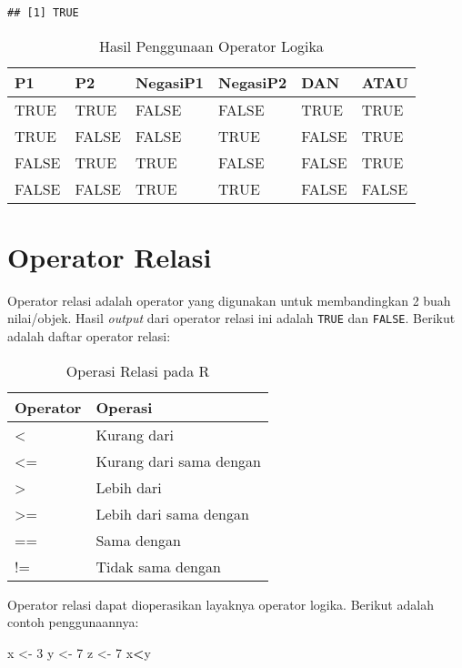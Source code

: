 \documentclass[
]{book}
\newenvironment{Shaded}{\begin{snugshade}}{\end{snugshade}}
\newcommand{\DecValTok}[1]{\textcolor[rgb]{0.00,0.00,0.81}{#1}}
\newcommand{\NormalTok}[1]{#1}
\newcommand{\OperatorTok}[1]{\textcolor[rgb]{0.81,0.36,0.00}{\textbf{#1}}}
\newcommand{\StringTok}[1]{\textcolor[rgb]{0.31,0.60,0.02}{#1}}
\begin{document}
\begin{verbatim}
## [1] TRUE
\end{verbatim}

\begin{table}

\caption{\label{tab:unnamed-chunk-28}Hasil Penggunaan Operator Logika}
\centering
\begin{tabular}[t]{llllll}
\toprule
P1 & P2 & NegasiP1 & NegasiP2 & DAN & ATAU\\
\midrule
TRUE & TRUE & FALSE & FALSE & TRUE & TRUE\\
TRUE & FALSE & FALSE & TRUE & FALSE & TRUE\\
FALSE & TRUE & TRUE & FALSE & FALSE & TRUE\\
FALSE & FALSE & TRUE & TRUE & FALSE & FALSE\\
\bottomrule
\end{tabular}
\end{table}

\hypertarget{relational}{%
\section{Operator Relasi}\label{relational}}

Operator relasi adalah operator yang digunakan untuk membandingkan 2 buah nilai/objek. Hasil \emph{output} dari operator relasi ini adalah \texttt{TRUE} dan \texttt{FALSE}. Berikut adalah daftar operator relasi:

\begin{table}

\caption{\label{tab:unnamed-chunk-29}Operasi Relasi pada R}
\centering
\begin{tabular}[t]{ll}
\toprule
Operator & Operasi\\
\midrule
< & Kurang dari\\
<= & Kurang dari sama dengan\\
> & Lebih dari\\
>= & Lebih dari sama dengan\\
== & Sama dengan\\
\addlinespace
!= & Tidak sama dengan\\
\bottomrule
\end{tabular}
\end{table}

Operator relasi dapat dioperasikan layaknya operator logika. Berikut adalah contoh penggunaannya:

\begin{Shaded}
\begin{Highlighting}[]
\NormalTok{x <-}\StringTok{ }\DecValTok{3}
\NormalTok{y <-}\StringTok{ }\DecValTok{7}
\NormalTok{z <-}\StringTok{ }\DecValTok{7}
\NormalTok{x}\OperatorTok{<}\NormalTok{y}
\end{Highlighting}
\end{Shaded}
\end{document}
